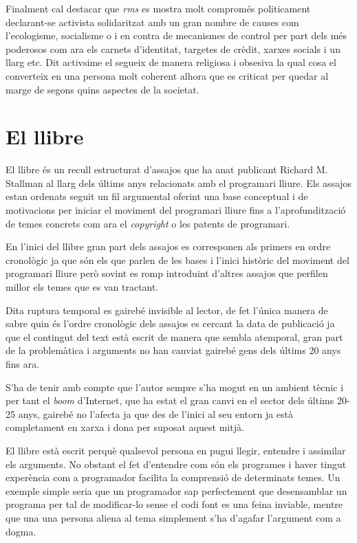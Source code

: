 \documentclass[a4paper,11pt]{scrartcl}
\begin{document}
Finalment cal destacar que \emph{rms} es mostra molt compromés politicament declarant-se activista
solidaritzat amb un gran nombre de causes com l'ecologisme, socialisme o i en contra de mecanismes
de control per part dels més poderosos com ara els carnets d'identitat,
targetes de crèdit, xarxes socials i un llarg etc. Dit activsime el segueix de manera religiosa
i obsesiva la qual cosa el converteix en una persona molt coherent alhora que es criticat
per quedar al marge de segons quins aspectes de la societat.

  \section{El llibre}

El llibre és un recull estructurat d'assajos que ha anat publicant Richard M. Stallman
al llarg dels últims anys relacionats amb el programari lliure. Els assajos estan ordenats
seguit un fil argumental oferint una base conceptual i de motivacions per iniciar el moviment
del programari lliure fins a l'aprofundització de temes concrets com ara el \emph{copyright} o
les patents de programari.

En l'inici del llibre gran part dels assajos es corresponen
als primers en ordre cronològic ja que són els que parlen de les bases i l'inici històric
del moviment del programari lliure però sovint es romp introduint d'altres assajos
que perfilen millor els temes que es van tractant.

Dita ruptura temporal es gairebé invisible al lector, de fet l'única manera de sabre
quin és l'ordre cronològic dels assajos es cercant la data de publicació ja que el
contingut del text està escrit de manera que sembla atemporal, gran part de la
problemàtica i arguments no han canviat gairebé gens dels últims 20 anys fins ara.

S'ha de tenir amb compte que l'autor sempre s'ha mogut en un ambient tècnic i per
tant el \emph{boom} d'Internet, que ha estat el gran canvi en el sector dels últims 20-25
anys, gairebé no l'afecta ja que des de l'inici al seu entorn ja està completament
en xarxa i dona per suposat aquest mitjà.

El llibre està escrit perquè qualsevol persona en pugui llegir, entendre i assimilar
els arguments. No obstant el fet d'entendre com són els programes i haver tingut
experència com a programador facilita la comprensió de determinats temes. Un exemple
simple seria que un programador sap perfectement que desensamblar un programa
per tal de modificar-lo sense el codi font es una feina inviable, mentre que 
una una persona aliena al tema simplement s'ha d'agafar l'argument com a dogma.
\end{document}
